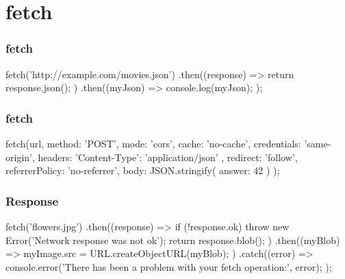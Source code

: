 \section{fetch}
\begin{frame}[fragile]
\frametitle{fetch}
\begin{CodeBox}{}
fetch('http://example.com/movies.json')
  .then((response) => {
    return response.json();
  })
  .then((myJson) => {
    console.log(myJson);
  });
\end{CodeBox}
\end{frame}

\begin{frame}[fragile]
\frametitle{fetch}
\begin{CodeBox}{}
fetch(url, {
  method: 'POST',
  mode: 'cors',
  cache: 'no-cache',
  credentials: 'same-origin',
  headers: {
    'Content-Type': 'application/json'
  },
  redirect: 'follow',
  referrerPolicy: 'no-referrer',
  body: JSON.stringify( { answer: 42 } )
});
\end{CodeBox}
\end{frame}

\begin{frame}[fragile]
\frametitle{Response}
\begin{CodeBox}{}
fetch('flowers.jpg')
  .then((response) => {
    if (!response.ok) {
      throw new Error('Network response was not ok');
    }
    return response.blob();
  })
  .then((myBlob) => {
    myImage.src = URL.createObjectURL(myBlob);
  })
  .catch((error) => {
    console.error('There has been a problem with your fetch operation:', error);
  });
  \end{CodeBox}
\end{frame}
